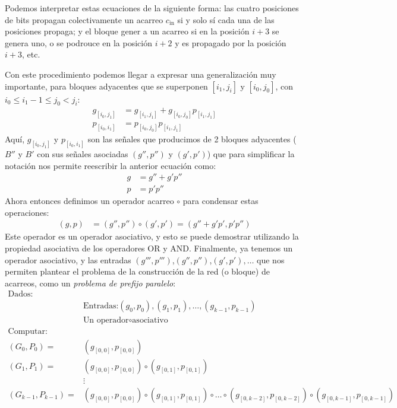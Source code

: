 Podemos interpretar estas ecuaciones de la siguiente forma: las cuatro posiciones de bits propagan colectivamente un acarreo $c_\text{in}$ si y solo sí cada una de las posiciones propaga; y el bloque gener	a un acarreo si en la posición $i+3$ se genera uno, o se podrouce en la posición $i+2$ y es propagado por la posición $i+3$, etc.

Con este procedimiento podemos llegar a expresar una generalización muy importante, para bloques adyacentes que se superponen $[i_1,j_i]$ y $[i_0,j_0]$, con $i_0 \leq i_1 - 1 \leq j_0 < j_i $:
\begin{equation}
\begin{align}
g_{[i_0,j_1]} &= g_{[i_1,j_1]}+g_{[i_0,j_0]}p_{[i_1,j_1]} \nonumber\\
p_{[i_0,i_1]} &= p_{[i_0,j_0]}p_{[i_1,j_1]}\nonumber
\end{align}
\end{equation}
Aquí, $g_{[i_0,j_1]}$ y $p_{[i_0,i_1]}$ son las señales que producimos de 2 bloques adyacentes ($B''$ y $B'$ con sus señales asociadas $(g'',p'')$ y $(g',p')$) que para simplificar la notación nos permite reescribir la anterior ecuación como:
\begin{equation}
\begin{align}
g &= g'' + g'p''\nonumber\\
p &= p'p''\nonumber
\end{align}
\end{equation}
Ahora entonces definimos un operador acarreo $\circ$ para condensar estas operaciones:
\begin{equation}
\begin{align}
(g,p) &= (g'',p'') \circ (g',p') = (g'' + g'p', p'p'')\nonumber
\end{align}
\end{equation}
Este operador es un operador asociativo, y esto se puede demostrar utilizando la propiedad asociativa de los operadores OR y AND. Finalmente, ya tenemos un operador asociativo, y las entradas $(g''',p''')$,$(g'',p'')$,$(g',p'),\ldots$ que nos permiten plantear el problema de la construcción de la red (o bloque) de acarreos, como un \emph{problema de prefijo paralelo}:
\begin{equation}\label{eq:ppProblem}
\begin{align}
\text{Dados:}\\
 & \text{Entradas:} (g_0,p_0),(g_1,p_1),\dotsc,(g_{k-1},p_{k-1}) \\
 & \text{Un operador} \circ \text{asociativo}\\ 
\text{Computar}:\\
(G_0,P_0) = &(g_{[0,0]},p_{[0,0]})\\
(G_1,P_1) = &(g_{[0,0]},p_{[0,0]})\circ(g_{[0,1]},p_{[0,1]})\\
&\vdots  \\
(G_{k-1},P_{k-1}) = &(g_{[0,0]},p_{[0,0]})\circ(g_{[0,1]},p_{[0,1]})\circ \dotsc \circ(g_{[0,k-2]},p_{[0,k-2]})\circ(g_{[0,k-1]},p_{[0,k-1]})
\end{align}
\end{equation}
